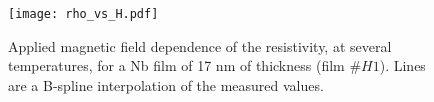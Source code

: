 \documentclass[reprint,onecolumn,superscriptaddress,a4paper,nofootinbib,floatfix]{revtex4-1}
\begin{document}
\begin{figure}[ht]
\renewcommand{\thefigure}{S\arabic{figure}}
\centering
\texttt{[image: rho\_vs\_H.pdf]}
\caption{Applied magnetic field dependence of the resistivity, at several temperatures, for a Nb film of 17 nm of thickness (film $\#H1$). Lines are a B-spline interpolation of the measured values.}  
\label{rho_H}
\end{figure}

\section*{}
\end{document}
